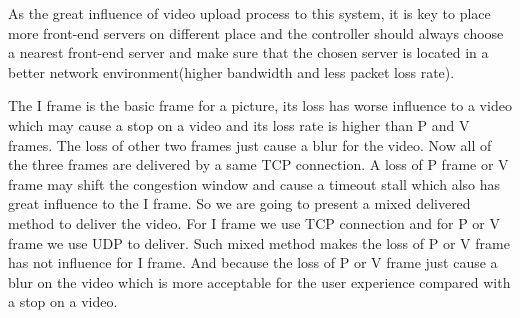 As the great influence of video upload process to this system, it is key to place more front-end servers on different place and the controller should always choose a nearest front-end server and make sure that the chosen server is located in a better network environment(higher bandwidth and less packet loss rate).  
 
 The I frame is the basic frame for a picture, its loss has worse influence to a video which may cause a stop on a video and its loss rate is higher than P and V frames. The loss of other two frames just cause a blur for the video. Now all of the three frames are delivered by a same TCP connection. A loss of P frame or V frame may shift the congestion window and cause a timeout stall which also has great influence to the I frame. So we are going to  present a mixed delivered method to deliver the video. For I frame we use TCP connection and for P or V frame we use UDP to deliver. Such mixed method makes the loss of P or V frame has not influence for I frame. And because the loss of P or V frame just cause a blur on the video which is more acceptable for the user experience compared with a stop on a video.
 
    